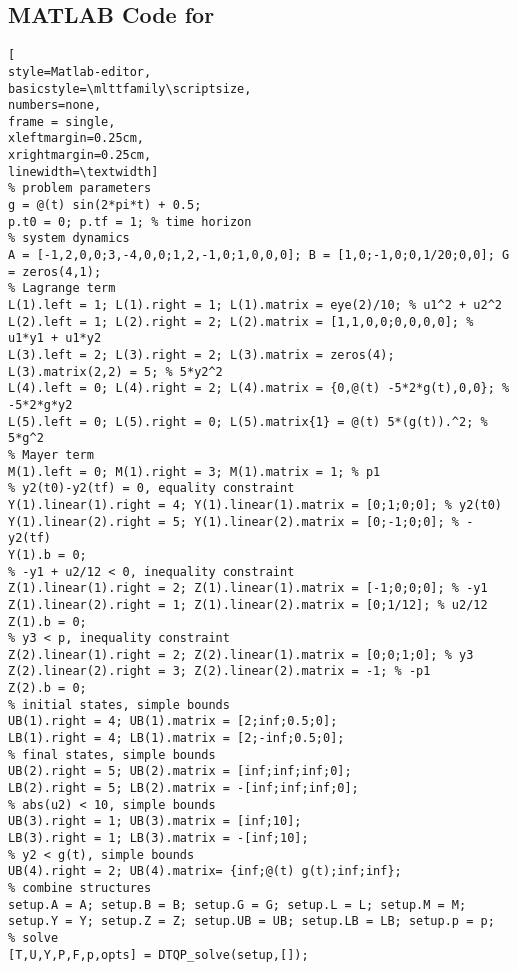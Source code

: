 \newpage

\subsection{MATLAB Code for } \label{sec:ex5-code}

\begin{lstlisting}[
style=Matlab-editor,
basicstyle=\mlttfamily\scriptsize,
numbers=none,
frame = single, 
xleftmargin=0.25cm,
xrightmargin=0.25cm,
linewidth=\textwidth]
% problem parameters
g = @(t) sin(2*pi*t) + 0.5;
p.t0 = 0; p.tf = 1; % time horizon
% system dynamics
A = [-1,2,0,0;3,-4,0,0;1,2,-1,0;1,0,0,0]; B = [1,0;-1,0;0,1/20;0,0]; G = zeros(4,1);
% Lagrange term
L(1).left = 1; L(1).right = 1; L(1).matrix = eye(2)/10; % u1^2 + u2^2
L(2).left = 1; L(2).right = 2; L(2).matrix = [1,1,0,0;0,0,0,0]; % u1*y1 + u1*y2
L(3).left = 2; L(3).right = 2; L(3).matrix = zeros(4); L(3).matrix(2,2) = 5; % 5*y2^2
L(4).left = 0; L(4).right = 2; L(4).matrix = {0,@(t) -5*2*g(t),0,0}; % -5*2*g*y2
L(5).left = 0; L(5).right = 0; L(5).matrix{1} = @(t) 5*(g(t)).^2; % 5*g^2
% Mayer term
M(1).left = 0; M(1).right = 3; M(1).matrix = 1; % p1
% y2(t0)-y2(tf) = 0, equality constraint
Y(1).linear(1).right = 4; Y(1).linear(1).matrix = [0;1;0;0]; % y2(t0)
Y(1).linear(2).right = 5; Y(1).linear(2).matrix = [0;-1;0;0]; % -y2(tf)
Y(1).b = 0;
% -y1 + u2/12 < 0, inequality constraint
Z(1).linear(1).right = 2; Z(1).linear(1).matrix = [-1;0;0;0]; % -y1
Z(1).linear(2).right = 1; Z(1).linear(2).matrix = [0;1/12]; % u2/12
Z(1).b = 0;
% y3 < p, inequality constraint
Z(2).linear(1).right = 2; Z(2).linear(1).matrix = [0;0;1;0]; % y3
Z(2).linear(2).right = 3; Z(2).linear(2).matrix = -1; % -p1
Z(2).b = 0;
% initial states, simple bounds
UB(1).right = 4; UB(1).matrix = [2;inf;0.5;0];
LB(1).right = 4; LB(1).matrix = [2;-inf;0.5;0]; 
% final states, simple bounds
UB(2).right = 5; UB(2).matrix = [inf;inf;inf;0];
LB(2).right = 5; LB(2).matrix = -[inf;inf;inf;0];
% abs(u2) < 10, simple bounds
UB(3).right = 1; UB(3).matrix = [inf;10];
LB(3).right = 1; LB(3).matrix = -[inf;10];
% y2 < g(t), simple bounds
UB(4).right = 2; UB(4).matrix= {inf;@(t) g(t);inf;inf};
% combine structures
setup.A = A; setup.B = B; setup.G = G; setup.L = L; setup.M = M; 
setup.Y = Y; setup.Z = Z; setup.UB = UB; setup.LB = LB; setup.p = p;
% solve
[T,U,Y,P,F,p,opts] = DTQP_solve(setup,[]);
\end{lstlisting}